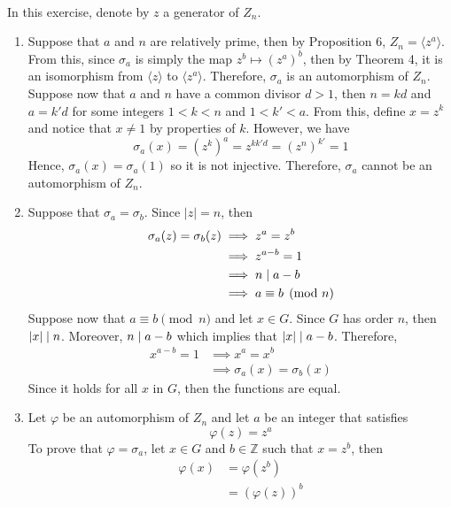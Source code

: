 \begin{solution}
    \\ In this exercise, denote by $z$ a generator of $Z_n$.
    \begin{enumerate}[label = \textbf{(\alph*)}]
        \item Suppose that $a$ and $n$ are relatively prime, then by Proposition 6, $Z_n = \langle z^a \rangle$. From this, since $\sigma_a$ is simply the map $z^b \mapsto (z^a)^b$, then by Theorem 4, it is an isomorphism from $\langle z \rangle$ to $\langle z^a \rangle$. Therefore, $\sigma_a$ is an automorphism of $Z_n$. \\
        Suppose now that $a$ and $n$ have a common divisor $d  > 1$, then $n = kd$ and $a = k'd$ for some integers $1 < k < n$ and $1 < k' < a$. From this, define $x = z^k$ and notice that $x \neq 1$ by properties of $k$. However, we have
        $$\sigma_a (x) = (z^k)^a = z^{kk'd} = (z^{n})^{k'} = 1$$
        Hence, $\sigma_a(x) = \sigma_a(1)$ so it is not injective. Therefore, $\sigma_a$ cannot be an automorphism of $Z_n$.
        \item Suppose that $\sigma_a = \sigma_b$. Since $|z|=n$, then
        \begin{align*}
            \sigma_a(z) = \sigma_b(z) &\implies z^a = z^b \\
            &\implies z^{a-b} = 1 \\
            &\implies n \mathrel{|} a-b \\
            &\implies a \equiv b \pmod{n}
        \end{align*}
        Suppose now that $a \equiv b \pmod{n}$ and let $x\in G$. Since $G$ has order $n$, then $|x| \mathrel{|} n$. Moreover, $n \mathrel{|} a-b$ which implies that $|x| \mathrel{|} a-b$. Therefore,
        \begin{align*}
            x^{a-b} = 1 &\implies x^a = x^b \\
            &\implies \sigma_a(x) = \sigma_b(x)
        \end{align*}
        Since it holds for all $x$ in $G$, then the functions are equal.
        \item Let $\varphi$ be an automorphism of $Z_n$ and let $a$ be an integer that satisfies 
        $$\varphi(z) = z^a$$
        To prove that $\varphi = \sigma_a$, let $x\in G$ and $b\in \mathbb{Z}$ such that $x = z^b$, then
        \begin{align*}
            \varphi(x) &= \varphi(z^b) \\
            &= (\varphi(z))^b \\

\end{align*}
\end{enumerate}
\end{solution}
